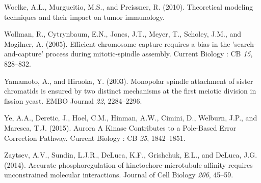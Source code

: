 \documentclass[12pt,a4paper,twoside,openright]{book}
\begin{document}
Woelke, A.L., Murgueitio, M.S., and Preissner, R. (2010). Theoretical
modeling techniques and their impact on tumor immunology.

Wollman, R., Cytrynbaum, E.N., Jones, J.T., Meyer, T., Scholey, J.M.,
and Mogilner, A. (2005). Efficient chromosome capture requires a bias in
the 'search-and-capture' process during mitotic-spindle assembly.
Current Biology : CB \emph{15}, 828--832.

Yamamoto, A., and Hiraoka, Y. (2003). Monopolar spindle attachment of
sister chromatids is ensured by two distinct mechanisms at the first
meiotic division in fission yeast. EMBO Journal \emph{22}, 2284--2296.

Ye, A.A., Deretic, J., Hoel, C.M., Hinman, A.W., Cimini, D., Welburn,
J.P., and Maresca, T.J. (2015). Aurora A Kinase Contributes to a
Pole-Based Error Correction Pathway. Current Biology : CB \emph{25},
1842--1851.

Zaytsev, A.V., Sundin, L.J.R., DeLuca, K.F., Grishchuk, E.L., and
DeLuca, J.G. (2014). Accurate phosphoregulation of
kinetochore-microtubule affinity requires unconstrained molecular
interactions. Journal of Cell Biology \emph{206}, 45--59.
\end{document}
